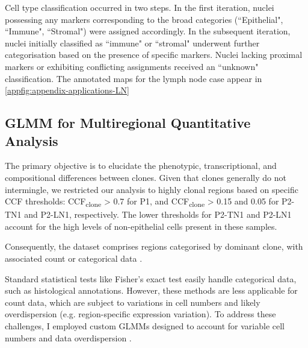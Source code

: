 Cell type classification occurred in two steps. In the first iteration, nuclei possessing any markers corresponding to the broad categories (``Epithelial", ``Immune", ``Stromal") were assigned accordingly. In the subsequent iteration, nuclei initially classified as ``immune" or ``stromal" underwent further categorisation based on the presence of specific markers. Nuclei lacking proximal markers or exhibiting conflicting assignments received an ``unknown" classification. The annotated maps for the lymph node case appear in \cref{appfig:appendix-applications-LN}


\subsection{\acs{GLMM} for Multiregional Quantitative Analysis}
\label{sec:modalities-glmm}

The primary objective is to elucidate the phenotypic, transcriptional, and compositional differences between clones. Given that clones generally do not intermingle, we restricted our analysis to highly clonal regions based on specific \ac{CCF} thresholds: CCF\textsubscript{clone} > 0.7 for P1, and CCF\textsubscript{clone} > 0.15 and 0.05 for P2-TN1 and P2-LN1, respectively. The lower thresholds for P2-TN1 and P2-LN1 account for the high levels of non-epithelial cells present in these samples.

Consequently, the dataset comprises regions categorised by dominant clone, with associated count or categorical data .

Standard statistical tests like Fisher's exact test easily handle categorical data, such as histological annotations. However, these methods are less applicable for count data, which are subject to variations in cell numbers and likely overdispersion (e.g. region-specific expression variation). To address these challenges, I employed custom \acfp{GLMM} designed to account for variable cell numbers and data overdispersion .

